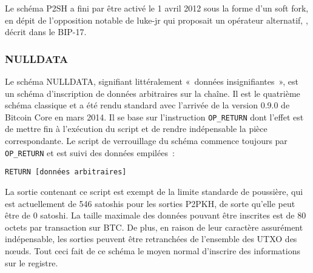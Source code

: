 Le schéma P2SH a fini par être activé le 1\ier{} avril 2012 sous la forme d'un soft fork, en dépit de l'opposition notable de luke-jr qui proposait un opérateur alternatif, , décrit dans le BIP-17.

\subsubsection{NULLDATA} Le schéma NULLDATA, signifiant littéralement «~données insignifiantes~», est un schéma d'inscription de données arbitraires sur la chaîne. Il est le quatrième schéma classique et a été rendu standard avec l'arrivée de la version 0.9.0 de Bitcoin Core en mars 2014. Il se base sur l'instruction \texttt{OP\_RETURN} dont l'effet est de mettre fin à l'exécution du script et de rendre indépensable la pièce correspondante. Le script de verrouillage du schéma commence toujours par \texttt{OP\_RETURN} et est suivi des données empilées~:

\begin{Verbatim}[fontsize=\footnotesize]
RETURN [données arbitraires]
\end{Verbatim}

La sortie contenant ce script est exempt de la limite standarde de poussière, qui est actuellement de 546 satoshis pour les sorties P2PKH, de sorte qu'elle peut être de 0 satoshi. La taille maximale des données pouvant être inscrites est de 80 octets par transaction sur BTC. De plus, en raison de leur caractère assurément indépensable, les sorties peuvent être retranchées de l'ensemble des UTXO des nœuds. Tout ceci fait de ce schéma le moyen normal d'inscrire des informations sur le registre.

